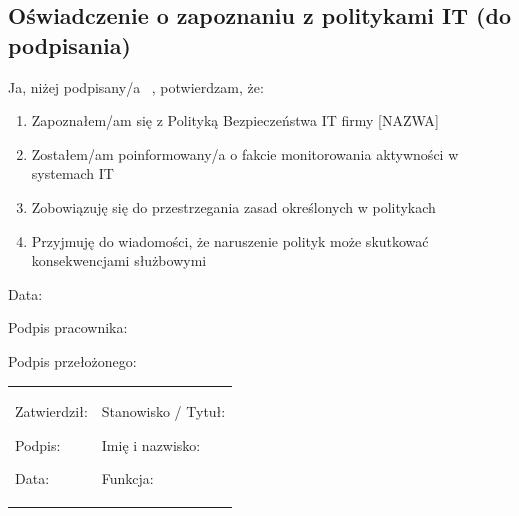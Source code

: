 \documentclass[12pt,a4paper]{article}
\providecommand{\tightlist}{\setlength{\itemsep}{0pt}\setlength{\parskip}{0pt}}
\begin{document}
\subsection{Oświadczenie o zapoznaniu z politykami IT (do
podpisania)}\label{oux15bwiadczenie-o-zapoznaniu-z-politykami-it-do-podpisania}

Ja, niżej podpisany/a {~}, potwierdzam, że:

\begin{enumerate}
\tightlist
\item
  Zapoznałem/am się z Polityką Bezpieczeństwa IT firmy {[}NAZWA{]}
\item
  Zostałem/am poinformowany/a o fakcie monitorowania aktywności w
  systemach IT
\item
  Zobowiązuję się do przestrzegania zasad określonych w politykach
\item
  Przyjmuję do wiadomości, że naruszenie polityk może skutkować
  konsekwencjami służbowymi
\end{enumerate}

Data: \underline{\hspace{3cm}}

Podpis pracownika: \underline{\hspace{3cm}}

Podpis przełożonego: \underline{\hspace{3cm}}

\begin{longtable}[]{@{}
  >{\raggedright\arraybackslash}p{}
  >{\raggedright\arraybackslash}p{}@{}}
\toprule\noalign{}
\endhead
\bottomrule\noalign{}
\endlastfoot
\begin{minipage}[t]{\linewidth}\raggedright
Zatwierdził:

Podpis: \underline{\hspace{3cm}}

Data: \underline{\hspace{4cm}}
\end{minipage} & \begin{minipage}[t]{\linewidth}\raggedright
Stanowisko / Tytuł:

Imię i nazwisko: \underline{\hspace{3cm}}

Funkcja: \underline{\hspace{3cm}}
\end{minipage} \\
\end{longtable}
\end{document}
